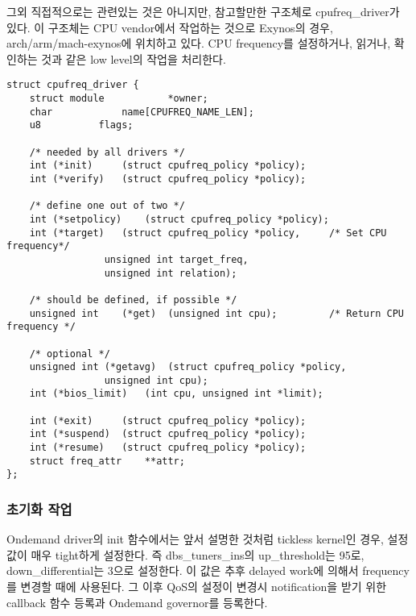 \vspace{\baselineskip}

그외 직접적으로는 관련있는 것은 아니지만, 참고할만한 구조체로 cpufreq\_driver가 있다. 
이 구조체는 CPU vendor에서 작업하는 것으로 Exynos의 경우, arch/arm/mach-exynos에 위치하고 있다. 
CPU frequency를 설정하거나, 읽거나, 확인하는 것과 같은 low level의 작업을 처리한다. 
\begin{lstlisting}
struct cpufreq_driver {
    struct module           *owner;
    char            name[CPUFREQ_NAME_LEN];
    u8          flags;
                     
    /* needed by all drivers */
    int (*init)     (struct cpufreq_policy *policy);
    int (*verify)   (struct cpufreq_policy *policy);
    
    /* define one out of two */
    int (*setpolicy)    (struct cpufreq_policy *policy);
    int (*target)   (struct cpufreq_policy *policy,     /* Set CPU frequency*/
                 unsigned int target_freq,
                 unsigned int relation);

    /* should be defined, if possible */
    unsigned int    (*get)  (unsigned int cpu);         /* Return CPU frequency */

    /* optional */
    unsigned int (*getavg)  (struct cpufreq_policy *policy,
                 unsigned int cpu);
    int (*bios_limit)   (int cpu, unsigned int *limit);

    int (*exit)     (struct cpufreq_policy *policy);
    int (*suspend)  (struct cpufreq_policy *policy);
    int (*resume)   (struct cpufreq_policy *policy);
    struct freq_attr    **attr;
};  
\end{lstlisting}



\subsubsection{초기화 작업}
Ondemand driver의 init 함수에서는 앞서 설명한 것처럼 tickless kernel인 경우, 설정 값이 매우 tight하게 설정한다. 
즉 dbs\_tuners\_ins의 up\_threshold는 95로, down\_differential는 3으로 설정한다.
이 값은 추후 delayed work에 의해서 frequency를 변경할 때에 사용된다. 
그 이후 QoS의 설정이 변경시 notification을 받기 위한 callback 함수 등록과 
Ondemand governor를 등록한다. 

